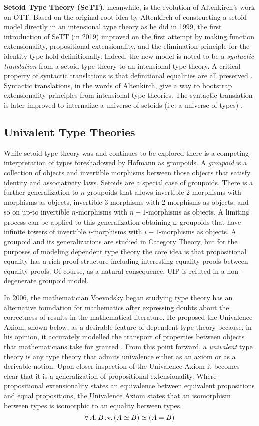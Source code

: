 \textbf{Setoid Type Theory (SeTT)}, meanwhile, is the evolution of Altenkirch's work on OTT.
Based on the original root idea by Altenkirch of constructing a setoid model directly in an intensional type theory as he did in 1999, the first introduction of SeTT (in 2019) improved on the first attempt by making function extensionality, propositional extensionality, and the elimination principle for the identity type hold definitionally.
Indeed, the new model is noted to be a \textit{syntactic translation} from a setoid type theory to an intensional type theory.
A critical property of syntactic translations is that definitional equalities are all preserved \cite{altenkirch2019}.
Syntactic translations, in the words of Altenkirch, give a way to bootstrap extensionality principles from intensional type theories.
The syntactic translation is later improved to internalize a universe of setoids (i.e. a universe of types) \cite{altenkirch2021}.

\subsection{Univalent Type Theories}

While setoid type theory was and continues to be explored there is a competing interpretation of types foreshadowed by Hofmann as groupoids.
A \textit{groupoid} is a collection of objects and invertible morphisms between those objects that satisfy identity and associativity laws.
Setoids are a special case of groupoids.
There is a further generalization to $n$-groupoids that allows invertible 2-morphisms with morphisms as objects, invertible 3-morphisms with 2-morphisms as objects, and so on up-to invertible $n$-morphisms with $n-1$-morphisms as objects.
A limiting process can be applied to this generalization obtaining $\omega$-groupoids that have infinite towers of invertible $i$-morphisms with $i-1$-morphisms as objects.
A groupoid and its generalizations are studied in Category Theory, but for the purposes of modeling dependent type theory the core idea is that propositional equality has a rich proof structure including interesting equality proofs between equality proofs.
Of course, as a natural consequence, UIP is refuted in a non-degenerate groupoid model.

In 2006, the mathematician Voevodsky began studying type theory has an alternative foundation for mathematics after expressing doubts about the correctness of results in the mathematical literature.
He proposed the Univalence Axiom, shown below, as a desirable feature of dependent type theory because, in his opinion, it accurately modelled the transport of properties between objects that mathematicians take for granted \cite{voevodsky2006}.
From this point forward, a \textit{univalent} type theory is any type theory that admits univalence either as an axiom or as a derivable notion.
Upon closer inspection of the Univalence Axiom it becomes clear that it is a generalization of propositional extensionality.
Where propositional extensionality states an equivalence between equivalent propositions and equal propositions, the Univalence Axiom states that an isomorphism between types is isomorphic to an equality between types.
$${\forall}\, A, B\! : \! \star.\, 
    (A \simeq B) \simeq (A = B)
$$

